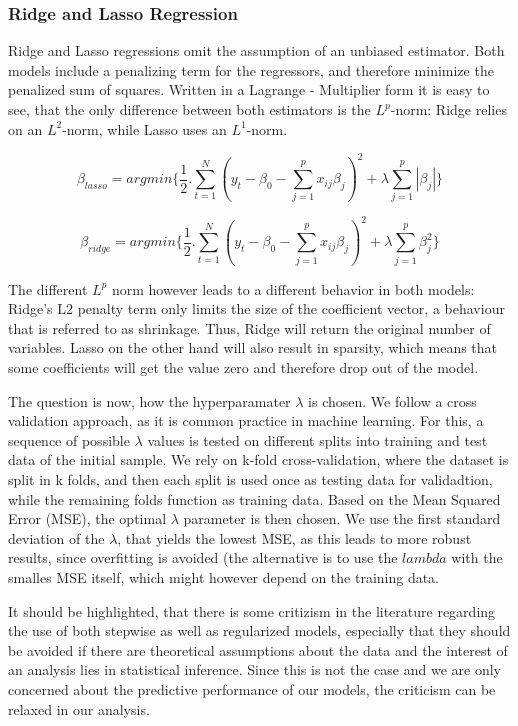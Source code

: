 \subsubsection{Ridge and Lasso Regression}
Ridge and Lasso regressions omit the assumption of an unbiased estimator. Both models include a penalizing term for the regressors, and therefore minimize the penalized sum of squares.  Written in a Lagrange - Multiplier form it is easy to see, that the only difference between both estimators is the $L^{p}$-norm: Ridge relies on an $L^{2}$-norm, while Lasso uses an  $L^{1}$-norm.  

\begin{equation}
\beta_{lasso}=argmin\{\frac{1}{2}.\sum_{t=1}^{N}(y_{t}-\beta_{0}-\sum_{j=1}^{p}x_{ij}\beta_{j})^{2}+\lambda\sum_{j=1}^{p}|\beta_{j}|\}
\end{equation}

\begin{equation}
\beta_{ridge}=argmin\{\frac{1}{2}.\sum_{t=1}^{N}(y_{t}-\beta_{0}-\sum_{j=1}^{p}x_{ij}\beta_{j})^{2}+\lambda\sum_{j=1}^{p}\beta_{j}^{2}\}
\end{equation}

The different $L^{p}$ norm however leads to a different behavior in both models: Ridge's L2 penalty term only limits the size of the coefficient vector, a behaviour that is referred to as shrinkage. Thus, Ridge will return the original number of variables.  Lasso on the other hand will also result in sparsity, which means that some coefficients will get the value zero and therefore drop out of the model. 

The question is now, how the hyperparamater $\lambda$ is chosen. We follow a cross validation approach, as it is common practice in machine learning. For this, a sequence of possible $\lambda$ values is tested on different splits into training and test data of the initial sample.  We rely on  k-fold cross-validation, where the dataset is split in k folds, and then each split is used once as testing data for validadtion, while the remaining folds function as training data. 
Based on the Mean Squared Error (MSE), the optimal $\lambda$ parameter is then chosen. We use the first standard deviation of the $\lambda$, that yields the lowest MSE, as this leads to more robust results, since overfitting is avoided (the alternative is to use the  $lambda$ with the smalles MSE itself, which might however depend on the training data. 

It should be highlighted, that there is some critizism in the literature regarding the use of both stepwise as well as regularized models, especially that they should be avoided if there are theoretical assumptions about the data and the interest of an analysis lies in statistical inference. Since this is not the case and we are only concerned about the predictive performance of our models, the criticism can be relaxed in our analysis. 



